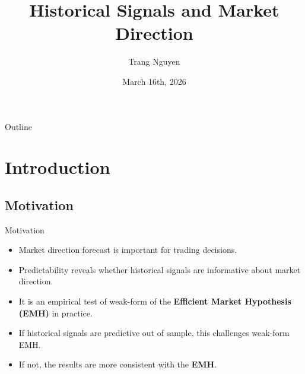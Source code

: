 \documentclass[aspectratio=169,t]{beamer} %
\title[Historical Signals and Market Direction]{Historical Signals and Market Direction}
\author{Trang Nguyen}
\institute{STAT 587: Data Science \\ Portland State University}
\date{March 16th, 2026}
\begin{document}
\begin{frame}[plain]
\end{frame}





\begin{frame}{Outline}
  \tableofcontents
\end{frame}


\section{Introduction}

\subsection{Motivation}

\begin{frame}{Motivation}
\begin{itemize}
    \item Market direction forecast is important for trading decisions.
    \item Predictability reveals whether historical signals are informative about market direction.
    \item It is an empirical test of weak-form of the \textbf{Efficient Market Hypothesis (EMH)} in practice.
    \item If historical signals are predictive out of sample, this challenges weak-form EMH.
    \item If not, the results are more consistent with the \textbf{EMH}.

\end{itemize}
\end{frame}
\end{document}
